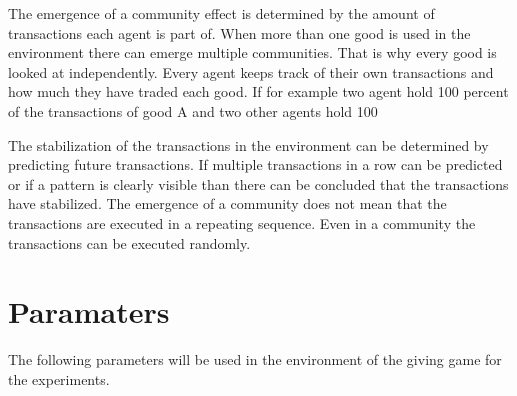 \documentclass[twoside,openright]{uva-bachelor-thesis}
\begin{document}
The emergence of a community effect is determined by the amount of transactions each agent is part of. When more than one good is used in the environment there can emerge multiple communities. That is why every good is looked at independently. Every agent keeps track of their own transactions and how much they have traded each good. If for example two agent hold 100 percent of the transactions of good A and two other agents hold 100%

The stabilization of the transactions in the environment can be determined by predicting future transactions. If multiple transactions in a row can be predicted or if a pattern is clearly visible than there can be concluded that the transactions have stabilized. The emergence of a community does not mean that the transactions are executed in a repeating sequence. Even in a community the transactions can be executed randomly.


\section{Paramaters}
The following parameters will be used in the environment of the giving game for the experiments.
\end{document}
